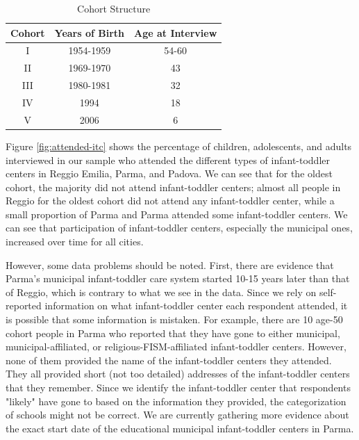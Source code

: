\begin{table}[H] \caption{Cohort Structure} \label{tab:cohort-structure}
\begin{tabular}{ccc}
\toprule
Cohort & Years of Birth & Age at Interview \\ \midrule
I 	   & 1954-1959 		& 54-60 \\
II 	   & 1969-1970		& 43	\\
III    & 1980-1981		& 32    \\
IV 	   & 1994			& 18 	\\
V 	   & 2006			& 6 \\ 
\bottomrule 
\end{tabular}
\end{table}

Figure \ref{fig:attended-itc} shows the percentage of children, adolescents, and adults interviewed in our sample who attended the different types of infant-toddler centers in Reggio Emilia, Parma, and Padova. We can see that for the oldest cohort, the majority did not attend infant-toddler centers; almost all people in Reggio for the oldest cohort did not attend any infant-toddler center, while a small proportion of Parma and Parma attended some infant-toddler centers. We can see that participation of infant-toddler centers, especially the municipal ones, increased over time for all cities.

However, some data problems should be noted. First, there are evidence that Parma's municipal infant-toddler care system started 10-15 years later than that of Reggio, which is contrary to what we see in the data. Since we rely on self-reported information on what infant-toddler center each respondent attended, it is possible that some information is mistaken. For example, there are 10 age-50 cohort people in Parma who reported that they have gone to either municipal, municipal-affiliated, or religious-FISM-affiliated infant-toddler centers. However, none of them provided the name of the infant-toddler centers they attended. They all provided short (not too detailed) addresses of the infant-toddler centers that they remember. Since we identify the infant-toddler center that respondents "likely" have gone to based on the information they provided, the categorization of schools might not be correct. We are currently gathering more evidence about the exact start date of the educational municipal infant-toddler centers in Parma. 

